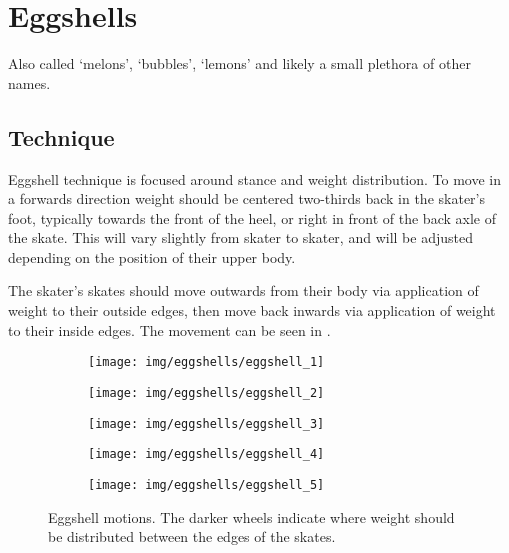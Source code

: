 \section{Eggshells}
\label{sec:sticky/eggshells}

Also called `melons', `bubbles', `lemons' and likely a small plethora of other names. 


\subsection*{Technique}

Eggshell technique is focused around stance and weight distribution.
To move in a forwards direction weight should be centered two-thirds back in the skater's foot, typically towards the front of the heel, or right in front of the back axle of the skate.  
This will vary slightly from skater to skater, and will be adjusted depending on the position of their upper body. 

The skater's skates should move outwards from their body via application of weight to their outside edges, then move back inwards via application of weight to their inside edges.
The movement can be seen in .

\begin{figure}
\begin{center}
\begin{subfigure}{0.19\linewidth}
\texttt{[image: img/eggshells/eggshell\_1]}
\end{subfigure}
\begin{subfigure}{0.19\linewidth}
\texttt{[image: img/eggshells/eggshell\_2]}
\end{subfigure}
\begin{subfigure}{0.19\linewidth}
\texttt{[image: img/eggshells/eggshell\_3]}
\end{subfigure}
\begin{subfigure}{0.19\linewidth}
\texttt{[image: img/eggshells/eggshell\_4]}
\end{subfigure}
\begin{subfigure}{0.19\linewidth}
\texttt{[image: img/eggshells/eggshell\_5]}
\end{subfigure}
\caption{Eggshell motions. The darker wheels indicate where weight should be distributed between the edges of the skates. 
\label{fig:sticky/eggshells}
}
\end{center}
\end{figure}


